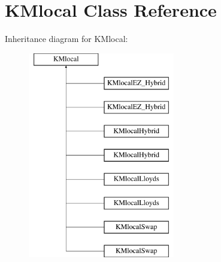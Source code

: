 \hypertarget{class_k_mlocal}{
\section{KMlocal Class Reference}
\label{class_k_mlocal}
}
Inheritance diagram for KMlocal:\begin{figure}[H]
\begin{center}
\leavevmode
\includegraphics[height=9cm]{class_k_mlocal}
\end{center}
\end{figure}
